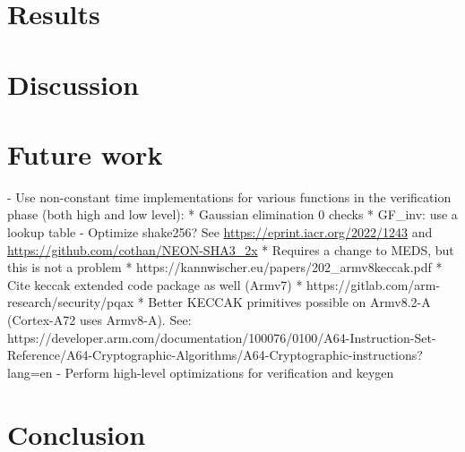 \documentclass[11pt,a4paper]{report}
\begin{document}
\chapter{Results}
\label{ch:results}

\chapter{Discussion}
\label{ch:discussion}

\chapter{Future work}
\label{ch:futurework}
- Use non-constant time implementations for various functions in the verification phase (both high and low level):
  * Gaussian elimination 0 checks
  * GF\_inv: use a lookup table
- Optimize shake256? See \url{https://eprint.iacr.org/2022/1243} and \url{https://github.com/cothan/NEON-SHA3\_2x}
  * Requires a change to MEDS, but this is not a problem
  * https://kannwischer.eu/papers/202\_armv8keccak.pdf
  * Cite keccak extended code package as well (Armv7)
  * https://gitlab.com/arm-research/security/pqax
  * Better KECCAK primitives possible on Armv8.2-A (Cortex-A72 uses Armv8-A). See: https://developer.arm.com/documentation/100076/0100/A64-Instruction-Set-Reference/A64-Cryptographic-Algorithms/A64-Cryptographic-instructions?lang=en
- Perform high-level optimizations for verification and keygen

\chapter{Conclusion}
\label{ch:conclusion}





\end{document}
